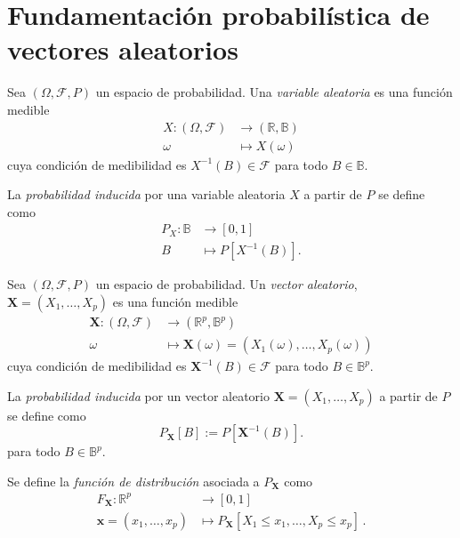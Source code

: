 \section{Fundamentación probabilística de vectores aleatorios}

\begin{ndef}
    Sea $(\Omega, \mathcal{F}, P)$ un espacio de probabilidad. Una \textit{variable aleatoria} es una función medible
    \begin{align*}
    X:(\Omega, \mathcal{F}) &\rightarrow (\mathbb{R}, \mathbb{B})\\
    \omega &\mapsto X(\omega)
    \end{align*}
    cuya condición de medibilidad es \(X^{-1}(B) \in \mathcal{F}\) para todo \(B \in \mathbb{B}\).
\end{ndef}

\begin{ndef}
    La \textit{probabilidad inducida} por una variable aleatoria $X$ a partir de $P$ se define como
    \begin{align*}
    P_{X}:\mathbb{B} &\rightarrow [0,1] \\
    B &\mapsto P[X^{-1}(B)].
    \end{align*}
\end{ndef}

\begin{ndef}
    Sea $(\Omega, \mathcal{F}, P)$ un espacio de probabilidad. Un \textit{vector aleatorio}, $\boldsymbol X = (X_1, \dots, X_p)$ es una función medible
    \begin{align*}
      \boldsymbol X:(\Omega, \mathcal{F}) &\rightarrow (\mathbb{R}^p, \mathbb{B}^p) \\
    \omega &\mapsto \boldsymbol X(\omega) = (X_1(\omega), \dots, X_p(\omega))
    \end{align*}
    cuya condición de medibilidad es \(\boldsymbol X^{-1}(B) \in \mathcal{F}\) para todo \( B \in \mathbb{B}^p\).
\end{ndef}

\begin{ndef}
    La \textit{probabilidad inducida} por un vector aleatorio $\boldsymbol X = (X_1, \dots, X_p)$ a partir de $P$ se define como
    \[
    P_{\boldsymbol X}[B] := P[\boldsymbol X^{-1}(B)]
    .\] para todo \(B \in \mathbb{B}^p\).
\end{ndef}

\begin{ndef}
    Se define la \textit{función de distribución} asociada a $P_{\boldsymbol X}$ como
    \begin{align*}
    F_{\boldsymbol X}:\mathbb{R}^p &\rightarrow [0,1] \\
    \boldsymbol x=(x_1,\dots,x_p) &\mapsto P_{\boldsymbol X}[X_1 \leq x_1, \dots, X_p \leq x_p]\,.
    \end{align*}
\end{ndef}

